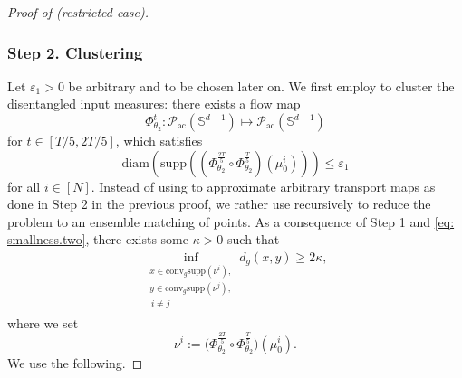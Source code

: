 \documentclass[a4paper,11pt]{article}
\theoremstyle{plain}
\newcommand{\supp}{\mathrm{supp}}
\newcommand{\conv}{\mathrm{conv}}
\renewcommand{\S}{\mathbb{S}^{d-1}}
\renewcommand{\leq}{\leqslant}
\renewcommand{\geq}{\geqslant}
\numberwithin{equation}{section}
\begin{document}
\begin{proof}[Proof of  (restricted case)]
\subsubsection*{Step 2. Clustering}
Let $\varepsilon_1>0$ be arbitrary and to be chosen later on.
We first employ  to cluster the disentangled input measures: there exists a flow map
\begin{equation*}
    \Phi^t_{\theta_2}:\mathscr{P}_{\text{ac}}(\S)\mapsto\mathscr{P}_{\text{ac}}(\S)
\end{equation*}
for $t\in[T/5, 2T/5]$, which satisfies 
    \begin{equation}\label{eq: smallness.two}
        \mathrm{diam}\left(\supp\left(\left(\Phi^{\frac{2T}{5}}_{\theta_2}\circ \Phi^{\frac{T}{5}}_{\theta_2}\right)(\mu^i_0)\right)\right)\leq \varepsilon_1
    \end{equation}
    for all $i\in[N]$. Instead of using  to approximate arbitrary transport maps as done in Step 2 in the previous proof, we rather use  recursively to reduce the problem to an ensemble matching of points. As a consequence of Step 1 and \eqref{eq: smallness.two}, there exists some $\kappa>0$ such that
    \begin{align}\label{eq: min.dist}
    \inf_{\substack{
    x\in\conv_g\supp(\nu^i),\\y\in\conv_g\supp(\nu^j),\\\,i\neq j
    }}d_g(x,y)\geq 2\kappa,
    \end{align}
    where we set 
    \begin{equation*}
        \nu^i:= \Bigg(\Phi^{\frac{2T}{5}}_{\theta_2}\circ \Phi^{\frac{T}{5}}_{\theta_2}\Bigg)(\mu^i_0).
    \end{equation*}
    We use the following.


\end{proof}
\end{document}
